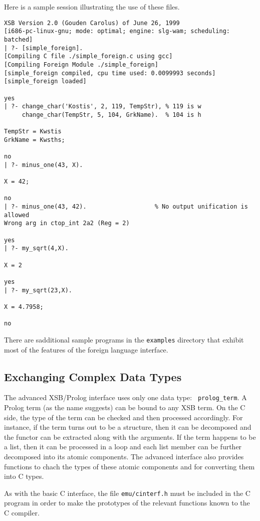 Here is a sample session illustrating the use of these files.
\begin{small}
\begin{verbatim}
XSB Version 2.0 (Gouden Carolus) of June 26, 1999
[i686-pc-linux-gnu; mode: optimal; engine: slg-wam; scheduling: batched]
| ?- [simple_foreign].
[Compiling C file ./simple_foreign.c using gcc]
[Compiling Foreign Module ./simple_foreign]
[simple_foreign compiled, cpu time used: 0.0099993 seconds]
[simple_foreign loaded]

yes
| ?- change_char('Kostis', 2, 119, TempStr), % 119 is w
     change_char(TempStr, 5, 104, GrkName).  % 104 is h

TempStr = Kwstis
GrkName = Kwsths;

no
| ?- minus_one(43, X).

X = 42;

no
| ?- minus_one(43, 42).                   % No output unification is allowed
Wrong arg in ctop_int 2a2 (Reg = 2)

yes
| ?- my_sqrt(4,X). 

X = 2

yes
| ?- my_sqrt(23,X).

X = 4.7958;

no
\end{verbatim}
\end{small}

There are sadditional sample programs in the {\tt examples} directory that
exhibit most of the features of the foreign language interface.


\subsection{Exchanging Complex Data Types}
\label{c2p_p2p_p2c}

The advanced XSB/Prolog interface uses only one data type: {\tt
prolog\_term}.  A Prolog term (as the name suggests) can be bound to any
XSB term. On the C side, the type of the term can be checked and then
processed accordingly.
For instance, if the term turns out to be a structure, then it can be
decomposed and the functor can be extracted along with the arguments.
If the term happens to be a list, then it can be processed in a loop and
each list member can be further decomposed into its atomic components.
The advanced interface also provides functions to chach the types of these
atomic components and for converting them into C types.

As with the basic C interface, the file {\tt emu/cinterf.h} must be
included in the C program in order to make the prototypes of the relevant
functions known to the C compiler.

